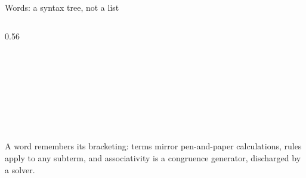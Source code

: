 \begin{frame}{Words: a syntax tree, not a list \InPaper}
\begin{columns}[c]
\begin{column}{0.56\textwidth}
\begin{code}[hide]
\\[\AgdaEmptyExtraSkip]%
%
\\[\AgdaEmptyExtraSkip]%
\>[0]\AgdaSpace{}%
\AgdaSymbol{:}\AgdaSpace{}%
\AgdaSpace{}%
\AgdaSpace{}%
\<%
\\
\>[0]\AgdaSpace{}%
\AgdaSpace{}%
\AgdaSymbol{=}\AgdaSpace{}%
\AgdaSpace{}%
\AgdaSymbol{(}\AgdaSpace{}%
\AgdaSymbol{)}\AgdaSpace{}%
\<%
\\
%
\\[\AgdaEmptyExtraSkip]%
\>[0]\<%
\\
\>[0][@{}l@{\AgdaIndent{0}}]%
\>[2]\AgdaSpace{}%
\AgdaSpace{}%
\AgdaSpace{}%
\AgdaSpace{}%
\AgdaSpace{}%
\AgdaSymbol{:}\AgdaSpace{}%
\AgdaSpace{}%
\<%
\\
%
\>[2]\AgdaOperator{\AgdaPostulate{\AgdaUnderscore{}===\AgdaUnderscore{}}}%
\>[14]\AgdaSymbol{:}\AgdaSpace{}%
\AgdaSpace{}%
\<%
\end{code}
A word remembers its bracketing: terms mirror pen-and-paper calculations,
rules apply to any subterm, and associativity is a \alert{congruence
generator}, discharged by a solver.


\end{column}
\end{columns}
\end{frame}
